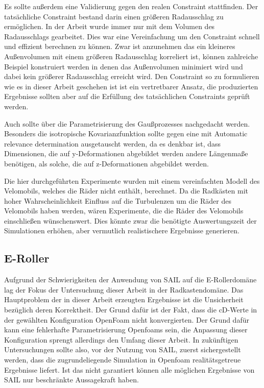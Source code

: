 Es sollte außerdem eine Validierung gegen den realen Constraint stattfinden.
Der tatsächliche Constraint bestand darin einen größeren Radausschlag zu ermöglichen.
In der Arbeit wurde immer nur mit dem Volumen des Radausschlags gearbeitet.
Dies war eine Vereinfachung um den Constraint schnell und effizient berechnen zu können.
Zwar ist anzunehmen das ein kleineres Außenvolumen mit einem größeren Radausschlag korreliert ist, können zahlreiche Beispiel konstruiert werden in denen das Außenvolumen minimiert wird und dabei kein größerer Radausschlag erreicht wird.
Den Constraint so zu formulieren wie es in dieser Arbeit geschehen ist ist ein vertretbarer Ansatz, die produzierten Ergebnisse sollten aber auf die Erfüllung des tatsächlichen Constraints geprüft werden.

Auch sollte über die Parametrisierung des Gaußprozesses nachgedacht werden.
Besonders die isotropische Kovarianzfunktion sollte gegen eine mit Automatic relevance determination ausgetauscht werden, da es denkbar ist, dass Dimensionen, die auf y-Deformationen abgebildet werden andere Längenmaße benötigen, als solche, die auf z-Deformationen abgebildet werden.

Die hier durchgeführten Experimente wurden mit einem vereinfachten Modell des Velomobils, welches die Räder nicht enthält, berechnet.
Da die Radkästen mit hoher Wahrscheinlichkeit Einfluss auf die Turbulenzen um die Räder des Velomobils haben werden, wären Experimente, die die Räder des Velomobils einschließen wünschenswert.
Dies könnte zwar die benötigte Auswertungszeit der Simulationen erhöhen, aber vermutlich realistischere Ergebnisse generieren.

\subsection{E-Roller}

Aufgrund der Schwierigkeiten der Anwendung von SAIL auf die E-Rollerdomäne lag der Fokus der Untersuchung dieser Arbeit in der Radkastendomäne.
Das Hauptproblem der in dieser Arbeit erzeugten Ergebnisse ist die Unsicherheit bezüglich deren Korrektheit.
Der Grund dafür ist der Fakt, dass die cD-Werte in der gewählten Konfiguration OpenFoam nicht konvergierten.
Der Grund dafür kann eine fehlerhafte Parametrisierung Openfoams sein, die Anpassung dieser Konfiguration sprengt allerdings den Umfang dieser Arbeit.
In zukünftigen Untersuchungen sollte also, vor der Nutzung von SAIL, zuerst sichergestellt werden, dass die zugrundeliegende Simulation in Openfoam realitätsgetreue Ergebnisse liefert.
Ist das nicht garantiert können alle möglichen Ergebnisse von SAIL nur beschränkte Aussagekraft haben.

